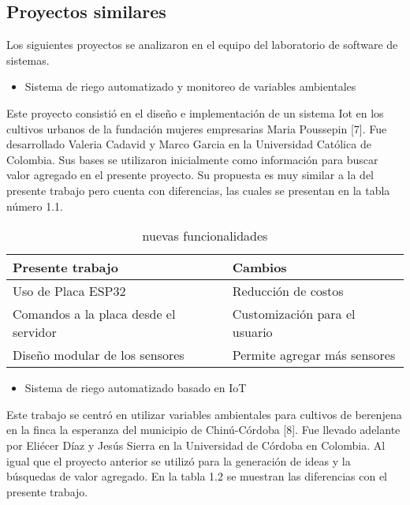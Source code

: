 \subsection{Proyectos similares}
Los siguientes proyectos se analizaron en el equipo del laboratorio de software de sistemas.\\

\begin{itemize}
\item Sistema de riego automatizado y monitoreo de variables ambientales
\end{itemize}
Este proyecto consistió en el diseño e implementación de un sistema Iot en los cultivos urbanos de la fundación mujeres empresarias Maria Poussepin [7].
Fue desarrollado Valeria Cadavid y Marco Garcia en la Universidad Católica de Colombia. Sus bases se utilizaron inicialmente como información para buscar valor agregado en el presente proyecto. Su propuesta es muy similar a la del presente trabajo pero cuenta con diferencias, las cuales se presentan en la tabla número 1.1.\\

\begin{table}[h]
	\centering
	\caption[caption corto]{nuevas funcionalidades}
	\begin{tabular}{l l}    
		\toprule
		\textbf{Presente trabajo} & \textbf{Cambios}\\	
		\midrule
		Uso de Placa ESP32           & Reducción de costos	\\		
		Comandos a la placa desde el servidor          & Customización para el usuario\\	
		Diseño modular de los sensores          & Permite agregar más sensores\\	
		\bottomrule
		\hline
	\end{tabular}
	\label{tab:peces}
\end{table}

\begin{itemize}
\item Sistema de riego automatizado basado en IoT
\end{itemize}
Este trabajo se centró en utilizar variables ambientales para cultivos de berenjena en la finca la esperanza del municipio de Chinú-Córdoba [8]. Fue llevado adelante por Eliécer Díaz y Jesús Sierra en la Universidad de Córdoba en Colombia. Al igual que el proyecto anterior se utilizó para la generación de ideas y la búsquedas de valor agregado. En la tabla 1.2 se muestran las diferencias con el presente trabajo.\\

